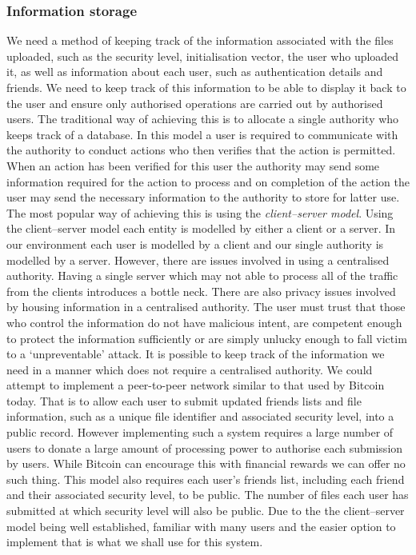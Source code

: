 \documentclass[12pt, titlepage]{article}
\begin{document}
\subsubsection{Information storage}
We need a method of keeping track of the information associated with the files uploaded, such as the security level, initialisation vector, the user who uploaded it, as well as information about each user, such as authentication details and friends. We need to keep track of this information to be able to display it back to the user and ensure only authorised operations are carried out by authorised users.
\newline \indent The traditional way of achieving this is to allocate a single authority who keeps track of a database. In this model a user is required to communicate with the authority to conduct actions who then verifies that the action is permitted. When an action has been verified for this user the authority may send some information required for the action to process and on completion of the action the user may send the necessary information to the authority to store for latter use. The most popular way of achieving this is using the \textit{client–server model}. Using the client–server model each entity is modelled by either a client or a server. In our environment each user is modelled by a client and our single authority is modelled by a server. However, there are issues involved in using a centralised authority. Having a single server which may not able to process all of the traffic from the clients introduces a bottle neck. There are also privacy issues involved by housing information in a centralised authority. The user must trust that those who control the information do not have malicious intent, are competent enough to protect the information sufficiently or are simply unlucky enough to fall victim to a `unpreventable' attack.  
\newline \indent It is possible to keep track of the information we need in a manner which does not require a centralised authority. We could attempt to implement a peer-to-peer network similar to that used by Bitcoin today. That is to allow each user to submit updated friends lists and file information, such as a unique file identifier and associated security level, into a public record. However implementing such a system requires a large number of users to donate a large amount of processing power to authorise each submission by users. While Bitcoin can encourage this with financial rewards we can offer no such thing. This model also requires each user's friends list, including each friend and their associated security level, to be public. The number of files each user has submitted at which security level will also be public.
\newline \indent Due to the the client–server model being well established, familiar with many users and the easier option to implement that is what we shall use for this system.
\end{document}
